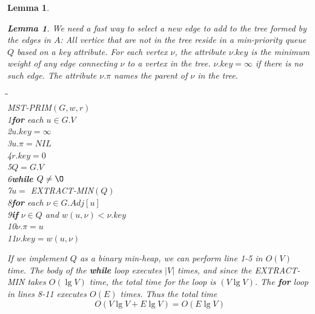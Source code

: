 \documentclass[a4paper,11pt]{book}
\newtheorem{lemma}[theorem]{Lemma}
\begin{document}
{\begin{lemma}
\begin{lemma}
We need a fast way to select a new edge to add to the tree formed by the edges in $A$: All vertice that are \emph{not} in the tree reside in a min-priority queue $Q$ based on a \emph{key} attribute. For each vertex $\nu$, the attribute $\nu.key$ is the minimum weight of any edge connecting $\nu$ to a vertex in the tree. $\nu.key = \infty$ if there is no such edge. The attribute $\nu.\pi$ names the parent of $\nu$ in the tree.
\begin{tabbing}
\hspace{.8cm}\=\hspace{.8cm}\=\hspace{.8cm}\=\hspace{.8cm}\=\\
MST-PRIM$(G,w,r)$\\
1\>\textbf{for} each $u\in G.V$\\
2\>\>$u.key = \infty$\\
3\>\>$u.\pi = NIL$\\
4\>$r.key = 0$\\
5\>$Q=G.V$\\
6\>\textbf{while} $Q \neq \O$\\
7\>\>$u =$ EXTRACT-MIN$(Q)$\\
8\>\>\textbf{for} each $\nu \in G.Adj[u]$\\
9\>\>\>\textbf{if} $\nu \in Q$ and $w(u,\nu) < \nu.key$\\
10\>\>\>\>$\nu.\pi = u$\\
11\>\>\>\>$\nu.key = w(u,\nu)$
\end{tabbing}
If we implement $Q$ as a binary min-heap, we can perform line 1-5 in $O(V)$ time. The body of the \textbf{while} loop executes $|V|$ times, and since the EXTRACT-MIN takes $O(\lg{V})$ time, the total time for the loop is $(V\lg{V})$. The \textbf{for} loop in lines 8-11 executes $O(E)$ times. Thus the total time \[O(V\lg{V} + E\lg{V})=O(E\lg{V})\]

\end{lemma}
\end{lemma}}
\end{document}
